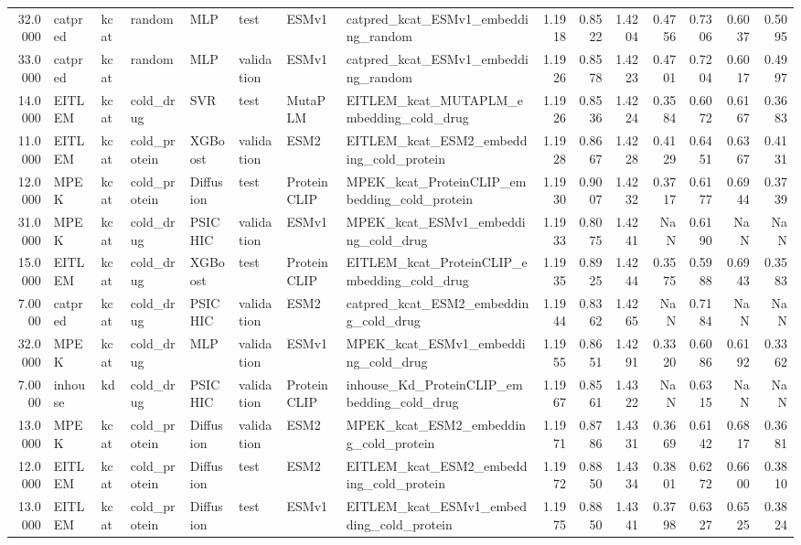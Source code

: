 \begin{tabular}{rlllllllrrrrrrr}
32.0000 & catpred & kcat & random & MLP & test & ESMv1 & catpred_kcat_ESMv1_embedding_random & 1.1918 & 0.8522 & 1.4204 & 0.4756 & 0.7306 & 0.6037 & 0.5095 \\
33.0000 & catpred & kcat & random & MLP & validation & ESMv1 & catpred_kcat_ESMv1_embedding_random & 1.1926 & 0.8578 & 1.4223 & 0.4701 & 0.7204 & 0.6017 & 0.4997 \\
14.0000 & EITLEM & kcat & cold_drug & SVR & test & MutaPLM & EITLEM_kcat_MUTAPLM_embedding_cold_drug & 1.1926 & 0.8536 & 1.4224 & 0.3584 & 0.6072 & 0.6167 & 0.3683 \\
11.0000 & EITLEM & kcat & cold_protein & XGBoost & validation & ESM2 & EITLEM_kcat_ESM2_embedding_cold_protein & 1.1928 & 0.8667 & 1.4228 & 0.4129 & 0.6451 & 0.6367 & 0.4131 \\
12.0000 & MPEK & kcat & cold_protein & Diffusion & test & ProteinCLIP & MPEK_kcat_ProteinCLIP_embedding_cold_protein & 1.1930 & 0.9007 & 1.4232 & 0.3717 & 0.6177 & 0.6944 & 0.3739 \\
31.0000 & MPEK & kcat & cold_drug & PSICHIC & validation & ESMv1 & MPEK_kcat_ESMv1_embedding_cold_drug & 1.1933 & 0.8075 & 1.4241 & NaN & 0.6190 & NaN & NaN \\
15.0000 & EITLEM & kcat & cold_drug & XGBoost & test & ProteinCLIP & EITLEM_kcat_ProteinCLIP_embedding_cold_drug & 1.1935 & 0.8925 & 1.4244 & 0.3575 & 0.5988 & 0.6943 & 0.3583 \\
7.0000 & catpred & kcat & cold_drug & PSICHIC & validation & ESM2 & catpred_kcat_ESM2_embedding_cold_drug & 1.1944 & 0.8362 & 1.4265 & NaN & 0.7184 & NaN & NaN \\
32.0000 & MPEK & kcat & cold_drug & MLP & validation & ESMv1 & MPEK_kcat_ESMv1_embedding_cold_drug & 1.1955 & 0.8651 & 1.4291 & 0.3320 & 0.6086 & 0.6192 & 0.3362 \\
7.0000 & inhouse & kd & cold_drug & PSICHIC & validation & ProteinCLIP & inhouse_Kd_ProteinCLIP_embedding_cold_drug & 1.1967 & 0.8561 & 1.4322 & NaN & 0.6315 & NaN & NaN \\
13.0000 & MPEK & kcat & cold_protein & Diffusion & validation & ESM2 & MPEK_kcat_ESM2_embedding_cold_protein & 1.1971 & 0.8786 & 1.4331 & 0.3669 & 0.6142 & 0.6817 & 0.3681 \\
12.0000 & EITLEM & kcat & cold_protein & Diffusion & test & ESM2 & EITLEM_kcat_ESM2_embedding_cold_protein & 1.1972 & 0.8850 & 1.4334 & 0.3801 & 0.6272 & 0.6600 & 0.3810 \\
13.0000 & EITLEM & kcat & cold_protein & Diffusion & test & ESMv1 & EITLEM_kcat_ESMv1_embedding_cold_protein & 1.1975 & 0.8850 & 1.4341 & 0.3798 & 0.6327 & 0.6525 & 0.3824 \\

\end{tabular}
